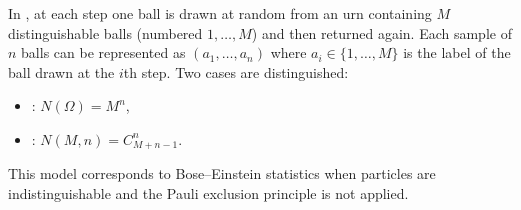 In , at each step one ball is drawn at random from an urn containing $M$ distinguishable balls (numbered $1, \ldots, M$) and then returned again. Each sample of $n$ balls can be represented as $(a_1, \ldots, a_n)$ where $a_i \in \{1, \ldots, M\}$ is the label of the ball drawn at the $i$th step. Two cases are distinguished:
\begin{itemize}
\item {}: $N(\Omega) = M^n$,
\item {}: $N(M,n) = C_{M+n-1}^{n}$.
\end{itemize}
This model corresponds to Bose--Einstein statistics when particles are indistinguishable and the Pauli exclusion principle is not applied.
